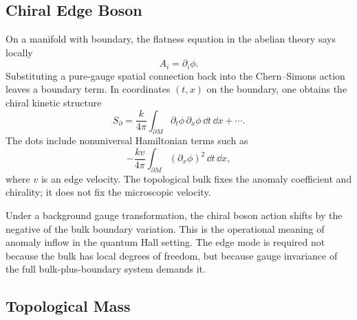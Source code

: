 
\subsection{Chiral Edge Boson}
\label{subsec:dense-boundary-chiral-boson}

On a manifold with boundary, the flatness equation in the abelian theory says locally
\begin{equation}
  A_i=\partial_i\phi.
  \label{eq:dense-boundary-pure-gauge}
\end{equation}
Substituting a pure-gauge spatial connection back into the Chern--Simons action leaves a boundary term. In coordinates $(t,x)$ on the boundary, one obtains the chiral kinetic structure
\begin{equation}
  S_{\partial}
  =
  \frac{k}{4\pi}\int_{\partial M}
  \partial_t\phi\,\partial_x\phi\,\dd t\,\dd x
  +\cdots.
  \label{eq:dense-boundary-kinetic}
\end{equation}
The dots include nonuniversal Hamiltonian terms such as
\begin{equation}
  -\frac{k v}{4\pi}\int_{\partial M}
  (\partial_x\phi)^2\,\dd t\,\dd x,
  \label{eq:dense-boundary-hamiltonian}
\end{equation}
where $v$ is an edge velocity. The topological bulk fixes the anomaly coefficient and chirality; it does not fix the microscopic velocity.

Under a background gauge transformation, the chiral boson action shifts by the negative of the bulk boundary variation. This is the operational meaning of anomaly inflow in the quantum Hall setting. The edge mode is required not because the bulk has local degrees of freedom, but because gauge invariance of the full bulk-plus-boundary system demands it.


\subsection{Topological Mass}
\label{subsec:dense-mcs-mode}

